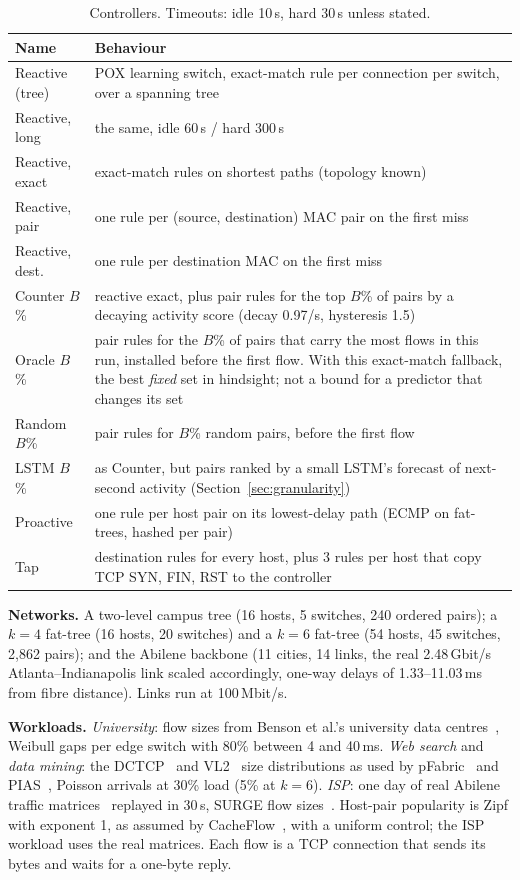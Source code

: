 \documentclass[sigconf]{acmart}
\begin{document}
\begin{table}[t]
\caption{Controllers. Timeouts: idle 10\,s, hard 30\,s unless stated.}\label{tab:controllers}
\centering\footnotesize
\begin{tabular}{@{}p{2.3cm}p{5.6cm}@{}}
\toprule
Name & Behaviour \\
\midrule
Reactive (tree) & POX learning switch, exact-match rule per connection per switch, over a spanning tree \\
Reactive, long & the same, idle 60\,s / hard 300\,s \\
Reactive, exact & exact-match rules on shortest paths (topology known) \\
Reactive, pair & one rule per (source, destination) MAC pair on the first miss \\
Reactive, dest. & one rule per destination MAC on the first miss \\
Counter $B$\% & reactive exact, plus pair rules for the top $B$\% of pairs by a decaying activity score (decay 0.97/s, hysteresis 1.5) \\
Oracle $B$\% & pair rules for the $B$\% of pairs that carry the most flows in this run, installed before the first flow. With this exact-match fallback, the best \emph{fixed} set in hindsight; not a bound for a predictor that changes its set \\
Random $B$\% & pair rules for $B$\% random pairs, before the first flow \\
LSTM $B$\% & as Counter, but pairs ranked by a small LSTM's forecast of next-second activity (Section~\ref{sec:granularity}) \\
Proactive & one rule per host pair on its lowest-delay path (ECMP on fat-trees, hashed per pair) \\
Tap & destination rules for every host, plus 3 rules per host that copy TCP SYN, FIN, RST to the controller \\
\bottomrule
\end{tabular}
\end{table}

\textbf{Networks.} A two-level campus tree (16 hosts, 5 switches, 240 ordered pairs); a $k{=}4$ fat-tree (16 hosts, 20 switches) and a $k{=}6$ fat-tree (54 hosts, 45 switches, 2,862 pairs); and the Abilene backbone (11 cities, 14 links, the real 2.48\,Gbit/s Atlanta--Indianapolis link scaled accordingly, one-way delays of 1.33--11.03\,ms from fibre distance). Links run at 100\,Mbit/s.

\textbf{Workloads.} \emph{University}: flow sizes from Benson et al.'s university data centres~\cite{benson}, Weibull gaps per edge switch with 80\% between 4 and 40\,ms. \emph{Web search} and \emph{data mining}: the DCTCP~\cite{dctcp} and VL2~\cite{vl2} size distributions as used by pFabric~\cite{pfabric} and PIAS~\cite{pias}, Poisson arrivals at 30\% load (5\% at $k{=}6$). \emph{ISP}: one day of real Abilene traffic matrices~\cite{zhang2005} replayed in 30\,s, SURGE flow sizes~\cite{surge}. Host-pair popularity is Zipf with exponent 1, as assumed by CacheFlow~\cite{cacheflow}, with a uniform control; the ISP workload uses the real matrices. Each flow is a TCP connection that sends its bytes and waits for a one-byte reply.
\end{document}
